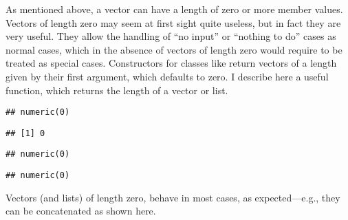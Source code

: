 \documentclass[krantz2]{krantz}\usepackage{knitr}
\begin{document}
\begin{explainbox}
As mentioned above, a vector can have a length of zero or more member values. Vectors of length zero may seem at first sight quite useless, but in fact they are very useful. They allow the handling of ``no input'' or ``nothing to do'' cases as normal cases, which in the absence of vectors of length zero would require to be treated as special cases. Constructors for \Rlang classes like  return vectors of a length given by their first argument, which defaults to zero. I describe here a useful function,  which returns the length of a vector or list.

\begin{knitrout}\footnotesize
{}\color{fgcolor}\begin{kframe}
\begin{alltt}
 \hlkwb{<-} \hlstd{(}\hlstd{)}
\end{alltt}
\begin{verbatim}
## numeric(0)
\end{verbatim}
\begin{alltt}
\end{alltt}
\begin{verbatim}
## [1] 0
\end{verbatim}
\end{kframe}
\end{knitrout}

\begin{knitrout}\footnotesize
{}\color{fgcolor}\begin{kframe}
\begin{alltt}
 \hlkwb{<-} \hlstd{()}
\end{alltt}
\begin{verbatim}
## numeric(0)
\end{verbatim}
\begin{alltt}
 \hlkwb{<-} \hlstd{(} \hlstd{=} \hlstd{)}
\end{alltt}
\begin{verbatim}
## numeric(0)
\end{verbatim}
\end{kframe}
\end{knitrout}

Vectors (and lists) of length zero, behave in most cases, as expected---e.g., they can be concatenated as shown here.


\end{explainbox}
\end{document}
